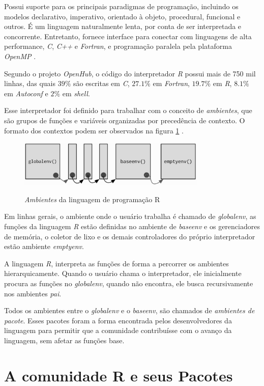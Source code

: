 Possui suporte para os principais paradigmas de programação, incluindo os modelos  declarativo, imperativo, orientado à objeto, procedural, funcional e outros. É um linguagem naturalmente lenta, por conta de ser interpretada e concorrente. Entretanto, fornece interface para conectar com linguagens de alta performance, \textit{C}, \textit{C++} e \textit{Fortran}, e programação paralela pela plataforma \textit{OpenMP} .

Segundo o projeto \textit{OpenHub}, o código do interpretador \textit{R} possui mais de 750 mil linhas, das quais $39\%$ são escritas em \textit{C}, $27.1\%$ em \textit{Fortran}, $19.7\%$ em \textit{R}, $8.1\%$ em \textit{Autoconf} e $2\%$ em \textit{shell}. 

Esse interpretador foi definido para trabalhar com o conceito de \textit{ambientes}, que são grupos de funções e variáveis organizadas por precedência de contexto. O formato dos contextos podem ser observados na figura \ref{fig:R_Envs} .

\begin{figure}[!htb]
	\centering
	\caption{\textit{Ambientes} da linguagem de programação R}
	\includegraphics[width=0.8\textwidth]{./04-figuras/R-envs}
	\label{fig:R_Envs}
\end{figure}

Em linhas gerais, o ambiente onde o usuário trabalha é chamado de \textit{globalenv}, as funções da linguagem \textit{R} estão definidas no ambiente de \textit{baseenv} e os gerenciadores de memória, o coletor de lixo e os demais controladores do próprio interpretador estão ambiente \textit{emptyenv}.

A linguagem \textit{R}, interpreta as funções de forma a percorrer os ambientes hierarquicamente. Quando o usuário chama o interpretador, ele inicialmente procura as funções no \textit{globalenv}, quando não encontra, ele busca recursivamente nos ambientes \textit{pai}.

Todos os ambientes entre o \textit{globalenv} e o \textit{baseenv}, são chamados de \textit{ambientes de pacote}. Esses pacotes foram a forma encontrada pelos desenvolvedores da linguagem para permitir que a comunidade contribuísse com o avanço da linguagem, sem afetar as funções base.

 




\section{A comunidade R e seus Pacotes}

